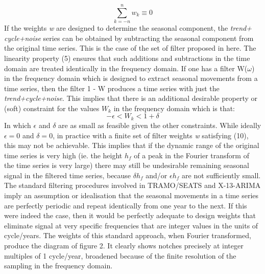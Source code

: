 \documentclass{article}
\begin{document}
\begin{equation}
\sum \limits_{k=-n}^n w_k \equiv 0
\end{equation}
If the weights \textit{w} are designed to determine the seasonal component, the \textit{trend+ cycle+noise} series can be obtained by subtracting the seasonal component from the original time series. This is the case of the set of filter proposed in here. The linearity property (5) ensures that such additions and subtractions in the time domain are treated identically in the frequency domain. If one has a filter W($\omega$) in the frequency domain which is designed to extract seasonal movements from a time series, then the filter 1 - W produces a time series with just the \textit{trend+cycle+noise}. This implies that there is an additional desirable property or (soft) constraint for the values $W_k$ in the frequency domain which is that:
\begin{equation}
-\epsilon < W_k < 1+\delta
\end{equation}
In which $\epsilon$ and $\delta$ are as small as feasible given the other constraints. While ideally $\epsilon=0$ and $\delta=0$, in practice with a finite set of filter weights \textit{w} satisfying (10), this may not be achievable. This implies that if the dynamic range of the original time series is very high (ie. the height $h_f$ of a peak in the Fourier transform of the time series is very large) there may still be undesirable remaining seasonal signal in the filtered time series, because $\delta h_f$ and/or $\epsilon h_f$ are not sufficiently small.\\The standard filtering procedures involved in TRAMO/SEATS and X-13-ARIMA imply an assumption or idealisation that the seasonal movements in a time series are perfectly periodic and repeat identically from one year to the next. If this were indeed the case, then it would be perfectly adequate to design weights that eliminate signal at very specific frequencies that are integer values in the units of cycle/years. The weights of this standard approach, when Fourier transformed, produce the diagram of figure 2. It clearly shows notches precisely at integer multiples of 1 cycle/year, broadened because of the finite resolution of the sampling in the frequency domain.\\
\end{document}
